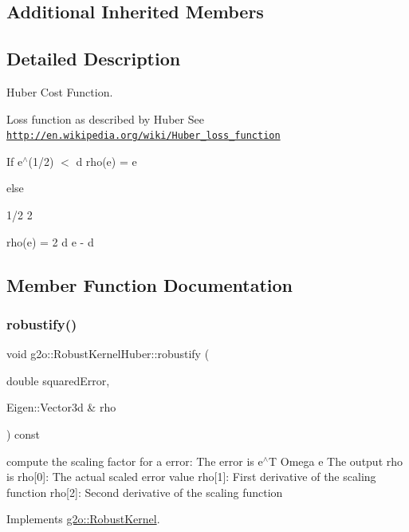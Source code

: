 \subsection*{Additional Inherited Members}


\subsection{Detailed Description}
Huber Cost Function. 

Loss function as described by Huber See \href{http://en.wikipedia.org/wiki/Huber_loss_function}{\tt http\+://en.\+wikipedia.\+org/wiki/\+Huber\+\_\+loss\+\_\+function}

If e$^\wedge$(1/2) $<$ d rho(e) = e

else \begin{DoxyVerb}          1/2    2
\end{DoxyVerb}
 rho(e) = 2 d e -\/ d 

\subsection{Member Function Documentation}
\mbox{\label{classg2o_1_1_robust_kernel_huber_aa437e8a62360ba63b56b383aac8e4674}} 
\subsubsection{\texorpdfstring{robustify()}{robustify()}}
{\footnotesize\ttfamily void g2o\+::\+Robust\+Kernel\+Huber\+::robustify (\begin{DoxyParamCaption}\item[{double}]{squared\+Error,  }\item[{Eigen\+::\+Vector3d \&}]{rho }\end{DoxyParamCaption}) const\hspace{0.3cm}{\ttfamily [virtual]}}

compute the scaling factor for a error\+: The error is e$^\wedge$T Omega e The output rho is rho\mbox{[}0\mbox{]}\+: The actual scaled error value rho\mbox{[}1\mbox{]}\+: First derivative of the scaling function rho\mbox{[}2\mbox{]}\+: Second derivative of the scaling function 

Implements \mbox{\hyperlink{classg2o_1_1_robust_kernel_ab47b071a0cfe466be063f0104bc41d0f}{g2o\+::\+Robust\+Kernel}}.

